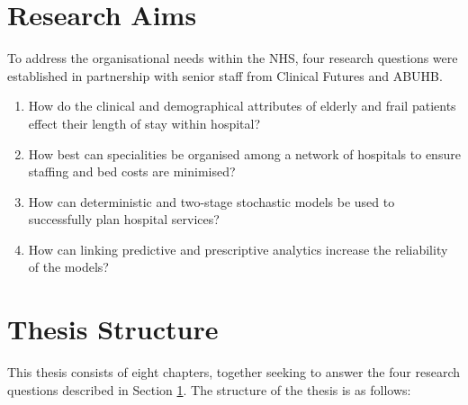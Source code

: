 \documentclass[../thesis.tex]{subfiles}
\begin{document}
\section{Research Aims}\label{sec:researchaims}
To address the organisational needs within the NHS, four research questions were established in partnership with senior staff from Clinical Futures and ABUHB.

\begin{enumerate}
    \item How do the clinical and demographical attributes of elderly and frail patients effect their length of stay within hospital? 
    
    \item How best can specialities be organised among a network of hospitals to ensure staffing and bed costs are minimised? %
    
    \item How can deterministic and two-stage stochastic models be used to successfully plan hospital services?%
    \item How can linking predictive and prescriptive analytics increase the reliability of the models?
\end{enumerate}

\section{Thesis Structure}
This thesis consists of eight chapters, together seeking to answer the four research questions described in Section \ref{sec:researchaims}. The structure of the thesis is as follows:
\end{document}
